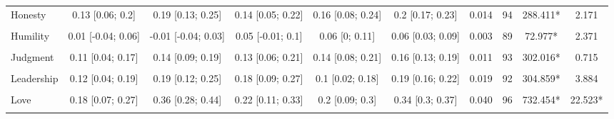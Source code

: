 \documentclass[
  letterpaper,
  DIV=11,
  numbers=noendperiod]{scrartcl}
\begin{document}
\begin{table}[H]
{\begin{tabular}[t]{lccccccccc}
Honesty & 0.13 [0.06; 0.2] & 0.19 [0.13; 0.25] & 0.14 [0.05; 0.22] & 0.16 [0.08; 0.24] & 0.2 [0.17; 0.23] & 0.014 & 94 & 288.411* & 2.171\\
\cellcolor{gray!10}{Hope} & \cellcolor{gray!10}{0.3 [0.22; 0.38]} & \cellcolor{gray!10}{0.48 [0.42; 0.54]} & \cellcolor{gray!10}{0.34 [0.24; 0.42]} & \cellcolor{gray!10}{0.34 [0.25; 0.42]} & \cellcolor{gray!10}{0.46 [0.42; 0.5]} & \cellcolor{gray!10}{0.035} & \cellcolor{gray!10}{98} & \cellcolor{gray!10}{500.465*} & \cellcolor{gray!10}{27.882*}\\
Humility & 0.01 [-0.04; 0.06] & -0.01 [-0.04; 0.03] & 0.05 [-0.01; 0.1] & 0.06 [0; 0.11] & 0.06 [0.03; 0.09] & 0.003 & 89 & 72.977* & 2.371\\
\addlinespace
\cellcolor{gray!10}{Humor} & \cellcolor{gray!10}{0.1 [0.04; 0.17]} & \cellcolor{gray!10}{0.18 [0.12; 0.23]} & \cellcolor{gray!10}{0.22 [0.14; 0.29]} & \cellcolor{gray!10}{0.12 [0.04; 0.19]} & \cellcolor{gray!10}{0.2 [0.16; 0.22]} & \cellcolor{gray!10}{0.014} & \cellcolor{gray!10}{94} & \cellcolor{gray!10}{212.629*} & \cellcolor{gray!10}{5.260*}\\
Judgment & 0.11 [0.04; 0.17] & 0.14 [0.09; 0.19] & 0.13 [0.06; 0.21] & 0.14 [0.08; 0.21] & 0.16 [0.13; 0.19] & 0.011 & 93 & 302.016* & 0.715\\
\cellcolor{gray!10}{Kindness} & \cellcolor{gray!10}{0.02 [-0.05; 0.09]} & \cellcolor{gray!10}{0.09 [0.03; 0.14]} & \cellcolor{gray!10}{0.06 [-0.02; 0.14]} & \cellcolor{gray!10}{0.08 [0; 0.15]} & \cellcolor{gray!10}{0.14 [0.1; 0.17]} & \cellcolor{gray!10}{0.011} & \cellcolor{gray!10}{95} & \cellcolor{gray!10}{161.189*} & \cellcolor{gray!10}{2.212}\\
Leadership & 0.12 [0.04; 0.19] & 0.19 [0.12; 0.25] & 0.18 [0.09; 0.27] & 0.1 [0.02; 0.18] & 0.19 [0.16; 0.22] & 0.019 & 92 & 304.859* & 3.884\\
\cellcolor{gray!10}{Love of learning} & \cellcolor{gray!10}{0.09 [0.02; 0.16]} & \cellcolor{gray!10}{0.2 [0.14; 0.26]} & \cellcolor{gray!10}{0.21 [0.12; 0.29]} & \cellcolor{gray!10}{0.13 [0.05; 0.2]} & \cellcolor{gray!10}{0.19 [0.16; 0.22]} & \cellcolor{gray!10}{0.017} & \cellcolor{gray!10}{94} & \cellcolor{gray!10}{379.885*} & \cellcolor{gray!10}{6.881*}\\
\addlinespace
Love & 0.18 [0.07; 0.27] & 0.36 [0.28; 0.44] & 0.22 [0.11; 0.33] & 0.2 [0.09; 0.3] & 0.34 [0.3; 0.37] & 0.040 & 96 & 732.454* & 22.523*\\
\cellcolor{gray!10}{Perseverance} & \cellcolor{gray!10}{0.17 [0.09; 0.24]} & \cellcolor{gray!10}{0.31 [0.24; 0.37]} & \cellcolor{gray!10}{0.18 [0.09; 0.27]} & \cellcolor{gray!10}{0.17 [0.09; 0.26]} & \cellcolor{gray!10}{0.27 [0.24; 0.3]} & \cellcolor{gray!10}{0.021} & \cellcolor{gray!10}{93} & \cellcolor{gray!10}{343.252*} & \cellcolor{gray!10}{15.308*}\\

\end{tabular}}
\end{table}
\end{document}

